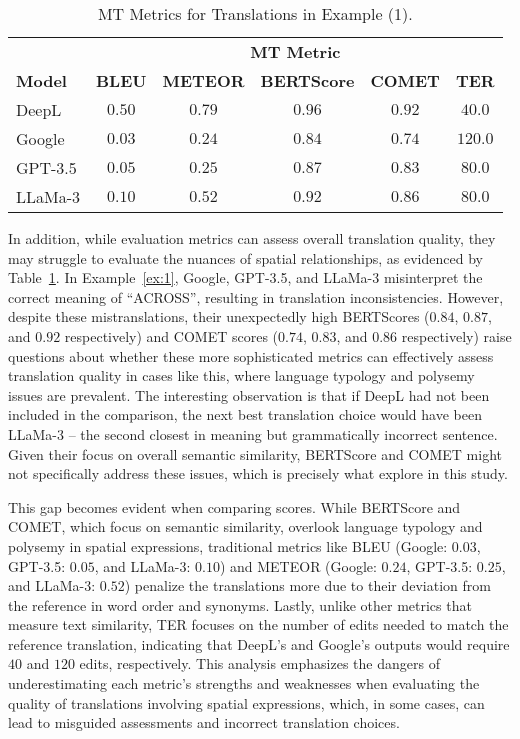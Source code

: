 \begin{table}[htb]
\small
  \centering
  \begin{tabular}{lccccc}
    \toprule
    & \multicolumn{5}{c}{\textbf{MT Metric}} \\
    \textbf{Model} & \textbf{BLEU} & \textbf{METEOR} & \textbf{BERTScore} & \textbf{COMET} & \textbf{TER} \\
    \midrule
    DeepL & $\mathbf{0.50}$ & $\mathbf{0.79}$ & $\mathbf{0.96}$ & $\mathbf{0.92}$ & $\mathbf{40.0}$ \\
    Google & $0.03$ & $0.24$ & $0.84$ & $0.74$ & $120.0$ \\
    GPT-3.5 & $0.05$ & $0.25$ & $0.87$ & $0.83$ & $80.0$ \\
    LLaMa-3 & $0.10$ & $0.52$ & $0.92$ & $0.86$ & $80.0$ \\
    \bottomrule
  \end{tabular}
\caption{MT Metrics for Translations in Example (1).}
\label{table:1.1}
\end{table}

In addition, while evaluation metrics can assess overall translation quality, they may struggle to evaluate the nuances of spatial relationships, as evidenced by Table~\ref{table:1.1}. In Example~\ref{ex:1}, Google, GPT-3.5, and LLaMa-3 misinterpret the correct meaning of ``ACROSS'', resulting in translation inconsistencies. However, despite these mistranslations, their unexpectedly high BERTScores ($0.84$, $0.87$, and $0.92$ respectively) and COMET scores ($0.74$, $0.83$, and $0.86$ respectively) raise questions about whether these more sophisticated metrics can effectively assess translation quality in cases like this, where language typology and polysemy issues are prevalent. The interesting observation is that if DeepL had not been included in the comparison, the next best translation choice would have been LLaMa-3 -- the second closest in meaning but grammatically incorrect sentence. Given their focus on overall semantic similarity, BERTScore and COMET might not specifically address these issues, which is precisely what explore in this study.

This gap becomes evident when comparing scores. While BERTScore and COMET, which focus on semantic similarity, overlook language typology and polysemy in spatial expressions, traditional metrics like BLEU (Google: $0.03$, GPT-3.5: $0.05$, and LLaMa-3: $0.10$) and METEOR (Google: $0.24$, GPT-3.5: $0.25$, and LLaMa-3: $0.52$) penalize the translations more due to their deviation from the reference in word order and synonyms. Lastly, unlike other metrics that measure text similarity, TER focuses on the number of edits needed to match the reference translation, indicating that DeepL's and Google's outputs would require $40$ and $120$ edits, respectively. This analysis emphasizes the dangers of underestimating each metric's strengths and weaknesses when evaluating the quality of translations involving spatial expressions, which, in some cases, can lead to misguided assessments and incorrect translation choices.


